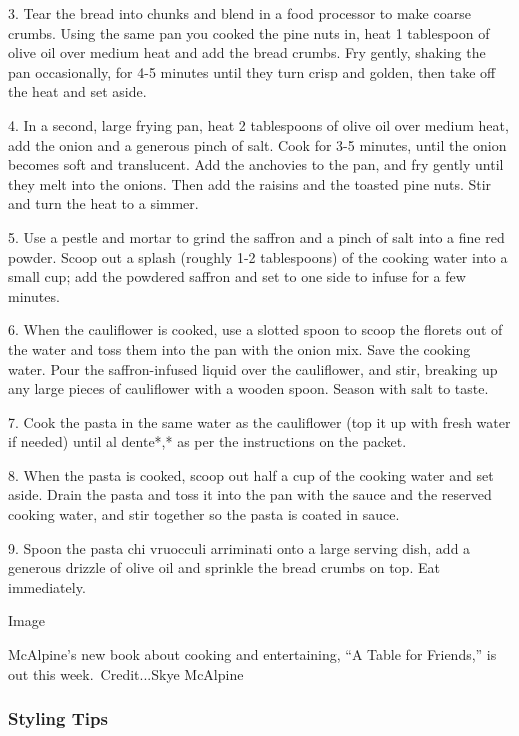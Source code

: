 3. Tear the bread into chunks and blend in a food processor to make
coarse crumbs. Using the same pan you cooked the pine nuts in, heat 1
tablespoon of olive oil over medium heat and add the bread crumbs. Fry
gently, shaking the pan occasionally, for 4-5 minutes until they turn
crisp and golden, then take off the heat and set aside.

4. In a second, large frying pan, heat 2 tablespoons of olive oil over
medium heat, add the onion and a generous pinch of salt. Cook for 3-5
minutes, until the onion becomes soft and translucent. Add the anchovies
to the pan, and fry gently until they melt into the onions. Then add the
raisins and the toasted pine nuts. Stir and turn the heat to a simmer.

5. Use a pestle and mortar to grind the saffron and a pinch of salt into
a fine red powder. Scoop out a splash (roughly 1-2 tablespoons) of the
cooking water into a small cup; add the powdered saffron and set to one
side to infuse for a few minutes.

6. When the cauliflower is cooked, use a slotted spoon to scoop the
florets out of the water and toss them into the pan with the onion mix.
Save the cooking water. Pour the saffron-infused liquid over the
cauliflower, and stir, breaking up any large pieces of cauliflower with
a wooden spoon. Season with salt to taste.

7. Cook the pasta in the same water as the cauliflower (top it up with
fresh water if needed) until al dente*,* as per the instructions on the
packet.

8. When the pasta is cooked, scoop out half a cup of the cooking water
and set aside. Drain the pasta and toss it into the pan with the sauce
and the reserved cooking water, and stir together so the pasta is coated
in sauce.

9. Spoon the pasta chi vruocculi arriminati onto a large serving dish,
add a generous drizzle of olive oil and sprinkle the bread crumbs on
top. Eat immediately.

Image

McAlpine's new book about cooking and entertaining, ``A Table for
Friends,'' is out this week.~Credit...Skye McAlpine

\hypertarget{styling-tips}{%
\subsubsection{\texorpdfstring{\textbf{Styling
Tips}}{Styling Tips}}\label{styling-tips}}

